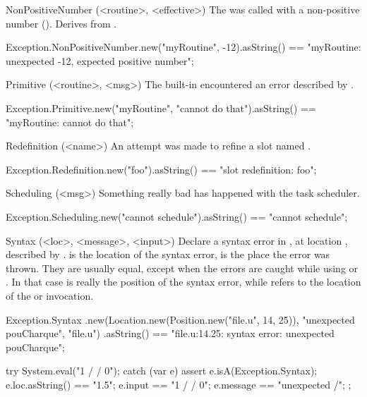 \begin{urbiscriptapi}
\item[NonPositiveNumber](<routine>, <effective>)
  The  was called with a non-positive number
  ().  Derives from .
\begin{urbiassert}
Exception.NonPositiveNumber.new("myRoutine", -12).asString()
== "myRoutine: unexpected -12, expected positive number";
\end{urbiassert}


\item[Primitive](<routine>, <msg>)
  The built-in  encountered an error described by
  .
\begin{urbiassert}
Exception.Primitive.new("myRoutine", "cannot do that").asString()
  == "myRoutine: cannot do that";
\end{urbiassert}


\item[Redefinition](<name>)
  An attempt was made to refine a slot named .
\begin{urbiassert}
Exception.Redefinition.new("foo").asString()
  == "slot redefinition: foo";
\end{urbiassert}


\item[Scheduling](<msg>)
  Something really bad has happened with the \urbi task scheduler.
\begin{urbiassert}
Exception.Scheduling.new("cannot schedule").asString()
  == "cannot schedule";
\end{urbiassert}


\item[Syntax](<loc>, <message>, <input>)%
  Declare a syntax error in , at location , described by
  .   is the location of the syntax error,
   is the place the error was thrown.  They are usually equal,
  except when the errors are caught while using  or
  .  In that case  is really the position of
  the syntax error, while  refers to the location of the
   or  invocation.
\begin{urbiassert}
Exception.Syntax
  .new(Location.new(Position.new("file.u", 14, 25)),
       "unexpected pouCharque", "file.u")
  .asString()
== "file.u:14.25: syntax error: unexpected pouCharque";
\end{urbiassert}

\begin{urbiscript}
try
{
  System.eval("1 / / 0");
}
catch (var e)
{
  assert
  {
    e.isA(Exception.Syntax);
    e.loc.asString() == "1.5";
    e.input == "1 / / 0";
    e.message == "unexpected /";
  }
};
\end{urbiscript}



\end{urbiscriptapi}
